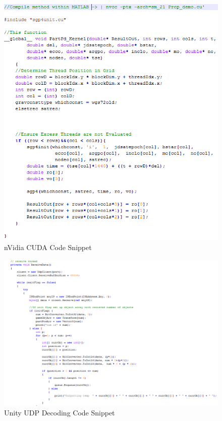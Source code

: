 \documentclass[12pt,openany,a4paper]{book}
\begin{document}
	\begin{figure}[H]
		\centering
		\caption{nVidia CUDA Code Snippet}
		\label{CUDA}
		\includegraphics[scale=0.8]{CUDA.png}
	\end{figure}
	
	\begin{figure}[H]
		\centering
		\caption{Unity UDP Decoding Code Snippet}
		\label{uUDP}
		\includegraphics[scale=0.8]{unitySnip.png}
	\end{figure}
\end{document}
